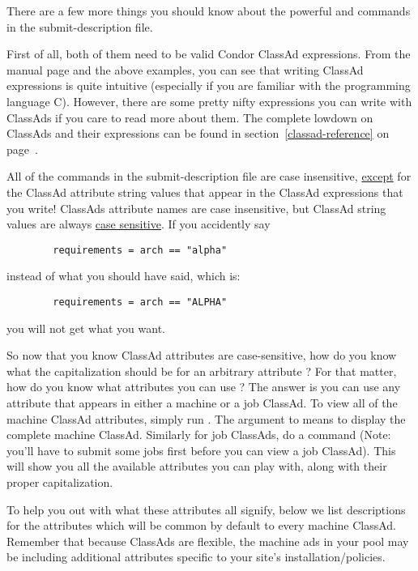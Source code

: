 There are a few more things you should know about the powerful
 and  commands in the submit-description file.

First of all, both of them need to be valid Condor ClassAd expressions.
From the  manual page and the above examples, you can see
that writing ClassAd expressions is quite intuitive (especially if you
are familiar with the programming language C).  However, there are some
pretty nifty expressions you can write with ClassAds if you care to read
more about them.  The complete lowdown on ClassAds and their expressions
can be found in section~\ref{classad-reference} on 
page~\pageref{classad-reference}.

All of the commands in the submit-description file are case insensitive, 
\underline{except} for the ClassAd attribute string values that appear in the
ClassAd expressions that you write!  ClassAds attribute names are
case insensitive, but ClassAd string
values are always \underline{case sensitive}.  If you accidently say
\begin{verbatim}
        requirements = arch == "alpha"
\end{verbatim}
instead of what you should have said, which is:
\begin{verbatim}
        requirements = arch == "ALPHA"
\end{verbatim}
you will not get what you want.

So now that you know ClassAd attributes are case-sensitive, how do you
know what the capitalization should be for an arbitrary attribute ?  For
that matter, how do you know what attributes you can use ?  The answer
is you can use any attribute that appears in either a machine or a job
ClassAd.  To view all of the machine ClassAd attributes, simply run .  The  argument to
 means to display the complete machine ClassAd.  Similarly
for job ClassAds, do a  command (Note: you'll have to submit some
jobs first before you can view a job ClassAd).  This
will show you all the available attributes you can play with, along with their
proper capitalization.  

To help you out with what these attributes all signify, below we list
descriptions for the attributes which will be common by default to every
machine ClassAd. Remember that because ClassAds are flexible, the
machine ads in your pool may be including additional attributes specific
to your site's installation/policies. 
\label{user-man-machad}



